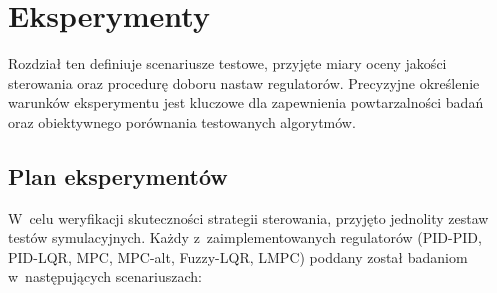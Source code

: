 \section{Eksperymenty}

Rozdział ten definiuje scenariusze testowe, przyjęte miary oceny jakości
sterowania oraz procedurę doboru nastaw regulatorów. Precyzyjne określenie
warunków eksperymentu jest kluczowe dla zapewnienia powtarzalności badań oraz
obiektywnego porównania testowanych algorytmów.

\subsection{Plan eksperymentów}

W~celu weryfikacji skuteczności strategii sterowania, przyjęto jednolity zestaw
testów symulacyjnych. Każdy z~zaimplementowanych regulatorów (PID-PID, PID-LQR, MPC, MPC-alt, Fuzzy-LQR, LMPC) poddany został badaniom w~następujących scenariuszach:

